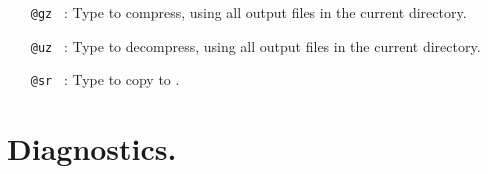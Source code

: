 \documentclass[12pt]{report}
\begin{document}
\begin{itemize}
\item[\tt @gz]~:
  Type  to compress, using  all output
  files in the current directory.

\item[\tt @uz]~:
  Type  to decompress, using  all output
  files in the current directory.

\item[\tt @sr]~:
  Type  to copy  to .

\end{itemize}

\section{ Diagnostics.} 
\end{document}
